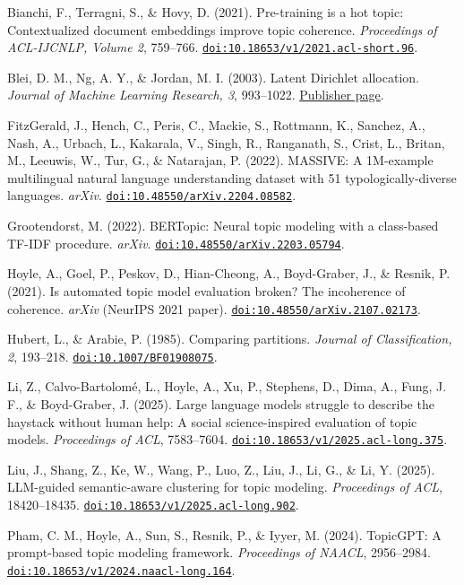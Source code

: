 \documentclass[
  11pt,
  a4paper,
]{article}
\begin{document}
Bianchi, F., Terragni, S., \& Hovy, D. (2021). Pre-training is a hot
topic: Contextualized document embeddings improve topic coherence.
\emph{Proceedings of ACL-IJCNLP, Volume 2}, 759--766.
\href{https://doi.org/10.18653/v1/2021.acl-short.96}{\nolinkurl{doi:10.18653/v1/2021.acl-short.96}}.

Blei, D. M., Ng, A. Y., \& Jordan, M. I. (2003). Latent Dirichlet
allocation. \emph{Journal of Machine Learning Research, 3}, 993--1022.
\href{https://www.jmlr.org/papers/v3/blei03a.html}{Publisher page}.

FitzGerald, J., Hench, C., Peris, C., Mackie, S., Rottmann, K., Sanchez,
A., Nash, A., Urbach, L., Kakarala, V., Singh, R., Ranganath, S., Crist,
L., Britan, M., Leeuwis, W., Tur, G., \& Natarajan, P. (2022). MASSIVE:
A 1M-example multilingual natural language understanding dataset with 51
typologically-diverse languages. \emph{arXiv}.
\href{https://doi.org/10.48550/arXiv.2204.08582}{\nolinkurl{doi:10.48550/arXiv.2204.08582}}.

Grootendorst, M. (2022). BERTopic: Neural topic modeling with a
class-based TF-IDF procedure. \emph{arXiv}.
\href{https://doi.org/10.48550/arXiv.2203.05794}{\nolinkurl{doi:10.48550/arXiv.2203.05794}}.

Hoyle, A., Goel, P., Peskov, D., Hian-Cheong, A., Boyd-Graber, J., \&
Resnik, P. (2021). Is automated topic model evaluation broken? The
incoherence of coherence. \emph{arXiv} (NeurIPS 2021 paper).
\href{https://doi.org/10.48550/arXiv.2107.02173}{\nolinkurl{doi:10.48550/arXiv.2107.02173}}.

Hubert, L., \& Arabie, P. (1985). Comparing partitions. \emph{Journal of
Classification, 2}, 193--218.
\href{https://doi.org/10.1007/BF01908075}{\nolinkurl{doi:10.1007/BF01908075}}.

Li, Z., Calvo-Bartolomé, L., Hoyle, A., Xu, P., Stephens, D., Dima, A.,
Fung, J. F., \& Boyd-Graber, J. (2025). Large language models struggle
to describe the haystack without human help: A social science-inspired
evaluation of topic models. \emph{Proceedings of ACL}, 7583--7604.
\href{https://doi.org/10.18653/v1/2025.acl-long.375}{\nolinkurl{doi:10.18653/v1/2025.acl-long.375}}.

Liu, J., Shang, Z., Ke, W., Wang, P., Luo, Z., Liu, J., Li, G., \& Li,
Y. (2025). LLM-guided semantic-aware clustering for topic modeling.
\emph{Proceedings of ACL}, 18420--18435.
\href{https://doi.org/10.18653/v1/2025.acl-long.902}{\nolinkurl{doi:10.18653/v1/2025.acl-long.902}}.

Pham, C. M., Hoyle, A., Sun, S., Resnik, P., \& Iyyer, M. (2024).
TopicGPT: A prompt-based topic modeling framework. \emph{Proceedings of
NAACL}, 2956--2984.
\href{https://doi.org/10.18653/v1/2024.naacl-long.164}{\nolinkurl{doi:10.18653/v1/2024.naacl-long.164}}.
\end{document}
